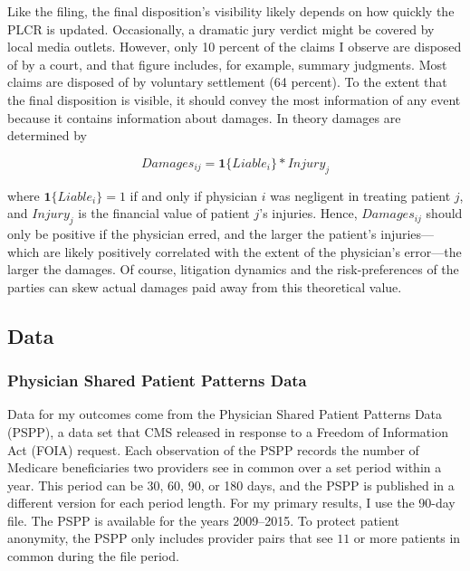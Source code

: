 \documentclass[
  12pt,
]{article}
\begin{document}
Like the filing, the final disposition's visibility likely depends on how quickly the PLCR is updated. Occasionally, a dramatic jury verdict might be covered by local media outlets. However, only 10 percent of the claims I observe are disposed of by a court, and that figure includes, for example, summary judgments. Most claims are disposed of by voluntary settlement (64 percent). To the extent that the final disposition is visible, it should convey the most information of any event because it contains information about damages. In theory damages are determined by

\begin{equation}
  Damages_{ij}=\mathbf{1}\{Liable_i\}*Injury_j
  \label{eq:damages}
\end{equation}

\noindent
where \(\mathbf{1}\{Liable_i\}=1\) if and only if physician \(i\) was negligent in treating patient \(j\), and \(Injury_j\) is the financial value of patient \(j\)'s injuries. Hence, \(Damages_{ij}\) should only be positive if the physician erred, and the larger the patient's injuries---which are likely positively correlated with the extent of the physician's error---the larger the damages. Of course, litigation dynamics and the risk-preferences of the parties can skew actual damages paid away from this theoretical value.

\hypertarget{data}{%
\subsection{Data}\label{data}}

\hypertarget{physician-shared-patient-patterns-data}{%
\subsubsection{Physician Shared Patient Patterns Data}\label{physician-shared-patient-patterns-data}}

Data for my outcomes come from the Physician Shared Patient Patterns Data (PSPP), a data set that CMS released in response to a Freedom of Information Act (FOIA) request. Each observation of the PSPP records the number of Medicare beneficiaries two providers see in common over a set period within a year. This period can be 30, 60, 90, or 180 days, and the PSPP is published in a different version for each period length. For my primary results, I use the 90-day file. The PSPP is available for the years 2009--2015. To protect patient anonymity, the PSPP only includes provider pairs that see \(11\) or more patients in common during the file period.
\end{document}
